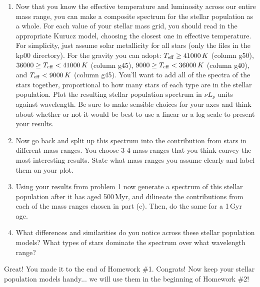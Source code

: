 \documentclass[11pt]{article}
\begin{document}
\begin{enumerate}
\begin{enumerate}
  \item Now that you know the effective temperature and luminosity
    across our entire mass range, you can make a composite spectrum
    for the stellar population as a whole.  For each value of your
    stellar mass grid, you should read in the appropriate Kurucz
    model, choosing the closest one in effective temperature. For
    simplicity, just assume solar metallicity for all stars (only the
    files in the kp00 directory). For the gravity you can adopt:
    $T_{\rm eff}\ge41000\,K$ (column g50), $36000\ge T_{\rm
      eff}<41000\,K$ (column g45), $9000\ge T_{\rm eff}<36000\,K$
    (column g40), and $T_{\rm eff}<9000\,K$ (column g45).  You'll want
    to add all of the spectra of the stars together, proportional to
    how many stars of each type are in the stellar population.  Plot
    the resulting stellar population spectrum in $\nu L_\nu$ units
    against wavelength.  Be sure to make sensible choices for your
    axes and think about whether or not it would be best to use a
    linear or a log scale to present your results.
  \item Now go back and split up this spectrum into the contribution
    from stars in different mass ranges.  You choose 3-4 mass ranges
    that you think convey the most interesting results.  State what
    mass ranges you assume clearly and label them on your plot.
  \item Using your results from problem 1 now generate a spectrum of
    this stellar population after it has aged 500\,Myr, and dilineate
    the contributions from each of the mass ranges chosen in part
    (c).  Then, do the same for a 1\,Gyr age.
  \item What differences and similarities do you notice across these
    stellar population models?  What types of stars dominate the
    spectrum over what wavelength range?
  \end{enumerate}
  Great! You made it to the end of Homework \#1.  Congrats!  Now keep
  your stellar population models handy... we will use them in the
  beginning of Homework \#2!
\end{enumerate}
\end{document}
